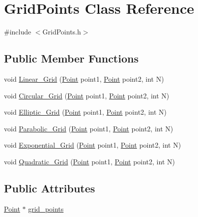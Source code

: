 \hypertarget{class_grid_points}{}\section{Grid\+Points Class Reference}
\label{class_grid_points}


{\ttfamily \#include $<$Grid\+Points.\+h$>$}

\subsection*{Public Member Functions}
\begin{DoxyCompactItemize}
\item 
void \hyperlink{class_grid_points_a557a1de0c4e971a1f00124c12393d35b}{Linear\+\_\+\+Grid} (\hyperlink{class_point}{Point} point1, \hyperlink{class_point}{Point} point2, int N)
\item 
void \hyperlink{class_grid_points_a2cd9f7d761cd106dc340b2a4b10da33c}{Circular\+\_\+\+Grid} (\hyperlink{class_point}{Point} point1, \hyperlink{class_point}{Point} point2, int N)
\item 
void \hyperlink{class_grid_points_ad67d842767dea1f762fffc1d6c4538ca}{Elliptic\+\_\+\+Grid} (\hyperlink{class_point}{Point} point1, \hyperlink{class_point}{Point} point2, int N)
\item 
void \hyperlink{class_grid_points_a7f8ba8461891af5a041deea1c6aa485c}{Parabolic\+\_\+\+Grid} (\hyperlink{class_point}{Point} point1, \hyperlink{class_point}{Point} point2, int N)
\item 
void \hyperlink{class_grid_points_a33d1514a1b36ae513bda9332bf8207ab}{Exponential\+\_\+\+Grid} (\hyperlink{class_point}{Point} point1, \hyperlink{class_point}{Point} point2, int N)
\item 
void \hyperlink{class_grid_points_a5961d7f154d16819467211a92f51a480}{Quadratic\+\_\+\+Grid} (\hyperlink{class_point}{Point} point1, \hyperlink{class_point}{Point} point2, int N)
\end{DoxyCompactItemize}
\subsection*{Public Attributes}
\begin{DoxyCompactItemize}
\item 
\hyperlink{class_point}{Point} $\ast$ \hyperlink{class_grid_points_aeb3801fe3a61a3c14fa9e23ad93b815d}{grid\+\_\+points}
\end{DoxyCompactItemize}
